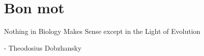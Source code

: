 \documentclass[
  a4paper,
]{scrbook}
\renewenvironment{quote}{\begin{myquote}}{\end{myquote}}
\begin{document}
\chapter{Bon mot}\label{bon-mot}

\begin{quote}
Nothing in Biology Makes Sense except in the Light of Evolution

- Theodosius Dobzhansky
\end{quote}


\backmatter
\end{document}

